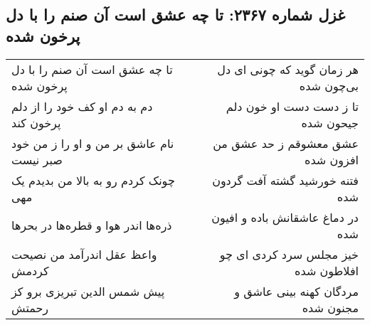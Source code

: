 \begin{center}
\section*{غزل شماره ۲۳۶۷: تا چه عشق است آن صنم را با دل پرخون شده}
\label{sec:2367}
\begin{longtable}{l p{0.5cm} r}
تا چه عشق است آن صنم را با دل پرخون شده
&&
هر زمان گوید که چونی ای دل بی‌چون شده
\\
دم به دم او کف خود را از دلم پرخون کند
&&
تا ز دست دست او خون دلم جیحون شده
\\
نام عاشق بر من و او را ز من خود صبر نیست
&&
عشق معشوقم ز حد عشق من افزون شده
\\
چونک کردم رو به بالا من بدیدم یک مهی
&&
فتنه خورشید گشته آفت گردون شده
\\
ذره‌ها اندر هوا و قطره‌ها در بحرها
&&
در دماغ عاشقانش باده و افیون شده
\\
واعظ عقل اندرآمد من نصیحت کردمش
&&
خیز مجلس سرد کردی ای چو افلاطون شده
\\
پیش شمس الدین تبریزی برو کز رحمتش
&&
مردگان کهنه بینی عاشق و مجنون شده
\\
\end{longtable}
\end{center}
